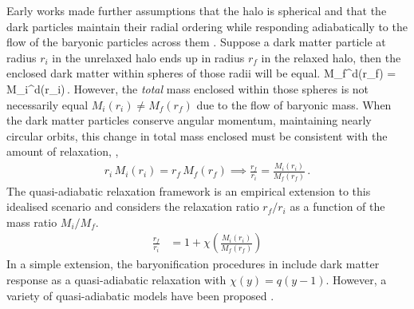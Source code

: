 Early works made further assumptions that the halo is spherical and that the dark particles maintain their radial ordering while responding adiabatically to the flow of the baryonic particles across them \citep[][]{1986ApJ...301...27B}. Suppose a dark matter particle at radius $r_i$ in the unrelaxed
halo ends up in radius $r_f$ in the relaxed halo, then the enclosed dark matter within spheres of those radii will be equal.
\be 
M_f^d(r_f) = M_i^d(r_i)\,.
\label{eq:DMmass}
\ee
However, the \emph{total} mass enclosed within those spheres is not necessarily equal $M_i(r_i) \neq M_f(r_f)$ due to the flow of baryonic mass. When the dark matter particles conserve angular momentum, maintaining nearly circular orbits, this change in total mass enclosed must be consistent with the amount of relaxation,
\citep[][]{1986ApJ...301...27B},
\begin{align}
    r_i \,M_i(r_i) = r_f \,M_f(r_f) %
    \implies 
\frac{r_f}{r_i} = \frac{M_i(r_i)}{M_f(r_f)}\,. 
\label{eq:AR}
\end{align}
The quasi-adiabatic relaxation framework is an empirical extension to this idealised scenario and considers the relaxation ratio $r_f/r_i$ as a function of the mass ratio $M_i/M_f$.
\begin{align}
\frac{r_f}{r_i} &= 1 + \chi \left( \frac{M_i(r_i)}{M_f(r_f)} \right) 
\label{eq:qAR}
\end{align}
In a simple extension, the baryonification procedures in \cite{2015JCAP...12..049S,2021MNRAS.503.4147P} include dark matter response as a quasi-adiabatic relaxation with $\chi(y) = q (y-1)$. However, a variety of quasi-adiabatic models have been proposed \citep{2023Velmani&Paranjape}.  

